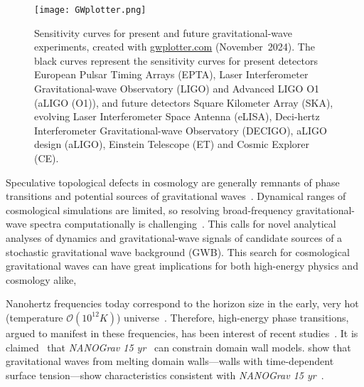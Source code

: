 \begin{figure}[hb]
    \centering
    \texttt{[image: GWplotter.png]}
    \caption{Sensitivity curves for present and future gravitational-wave experiments, created with \href{http://www.sr.bham.ac.uk/~cplb/GWplotter/}{\textsf{gwplotter.com}} (November~2024). The black curves represent the sensitivity curves for present detectors European Pulsar Timing Arrays (EPTA), Laser Interferometer Gravitational-wave Observatory (LIGO) and Advanced LIGO O1 (aLIGO (O1)), and future detectors Square Kilometer Array (SKA), evolving Laser Interferometer Space Antenna (eLISA), Deci-hertz Interferometer Gravitational-wave Observatory (DECIGO), aLIGO design (aLIGO), Einstein Telescope (ET) and Cosmic Explorer (CE).}
    \label{fig:intro:GWplotter}
\end{figure}


Speculative topological defects in cosmology are generally remnants of phase transitions and potential sources of gravitational waves~\citep{christiansenGravitationalWavesDark2024,saikawaReviewGravitationalWaves2017}. Dynamical ranges of cosmological simulations are limited, so resolving broad-frequency gravitational-wave spectra computationally is challenging~\citep{saikawaReviewGravitationalWaves2017}. This calls for novel analytical analyses of dynamics and gravitational-wave signals of candidate sources of a stochastic gravitational wave background (GWB). This search for cosmological gravitational waves can have great implications for both high-energy physics and cosmology alike,  

Nanohertz frequencies today correspond to the horizon size in the early, very hot (temperature $\mathscr{O}(10^{12}\unit{K})$) universe~\citep{christiansenGravitationalWavesDark2024}. Therefore, high-energy phase transitions, argued to manifest in these frequencies, has been interest of recent studies~\citep{babichevNANOGravSpectralIndex2023,saikawaReviewGravitationalWaves2017,liProbingHighTemperature2023,hiramatsuGravitationalWavesCollapsing2010}. It is claimed~\citep{afzalNANOGrav15Yr2023} that \textit{NANOGrav 15 yr}~\cite{agazieNANOGrav15Yr2023a} can constrain domain wall models.  show that gravitational waves from melting domain walls---walls with time-dependent surface tension---show characteristics consistent with \textit{NANOGrav 15 yr}~\cite{agazieNANOGrav15Yr2023a}.  



